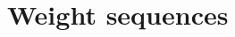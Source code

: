 \documentclass[11pt,a4paper]{article}
\theoremstyle{plain}
\theoremstyle{definition}
\begin{document}
%
%

\section{Weight sequences}\label{sect.WeightCondit}
\end{document}
